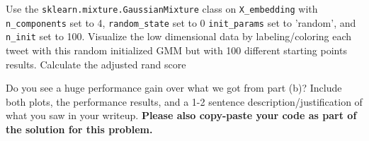 \documentclass[11pt]{article}
\begin{document}
\begin{enumerate}
Use the \verb|sklearn.mixture.GaussianMixture| class on \verb|X_embedding| with \verb|n_components| set to 4, \verb|random_state| set to 0 \verb|init_params| set to 'random', and  \verb|n_init| set to 100. 
Visualize the low dimensional data by labeling/coloring each tweet with this random initialized GMM but with 100 different starting points results. Calculate the adjusted rand score

Do you see a huge performance gain over what we got from part (b)? Include both plots, the performance results, and a 1-2 sentence description/justification of what you saw in your writeup. \textbf{Please also copy-paste your code as part of the solution for this problem.}\newline
\solution{}

\end{enumerate}
\end{document}
